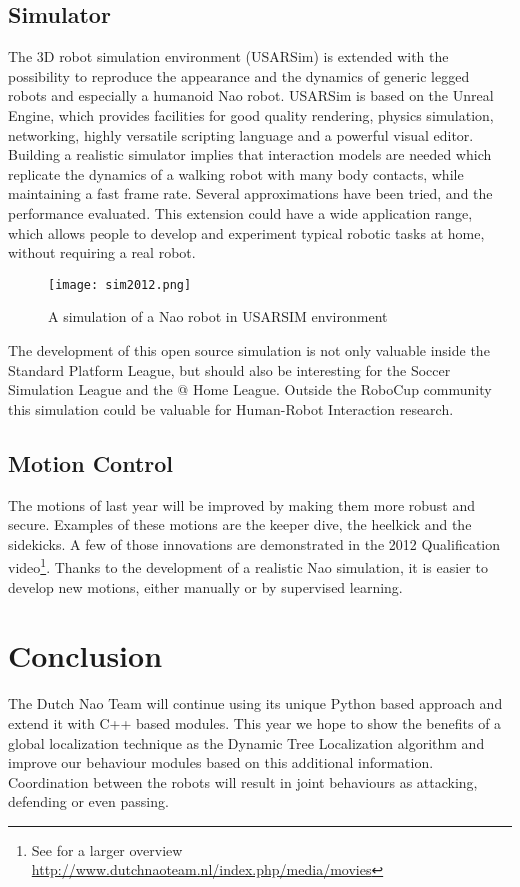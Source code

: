 \documentclass[11pt]{article}
\begin{document}
\subsection{Simulator}
The 3D robot simulation environment (USARSim) is extended with the possibility to reproduce the appearance and the dynamics of generic legged robots and especially a humanoid Nao robot. USARSim is based on the Unreal Engine, which provides facilities for good quality rendering, physics simulation, networking, highly versatile scripting language and a powerful visual editor. Building a realistic simulator implies that interaction models are needed which replicate the dynamics of a walking robot with many body contacts, while maintaining a fast frame rate. Several approximations have been tried, and the performance evaluated. This extension could have a wide application range, which allows people to develop and experiment typical robotic tasks at home, without requiring a real robot.
\begin{figure}[!ht]
\centering
\texttt{[image: sim2012.png]} %
\caption{A simulation of a Nao robot in USARSIM environment}
\end{figure}
The development of this open source simulation is not only valuable inside the Standard Platform League, but should also be interesting for the Soccer Simulation League and the @ Home League. Outside the RoboCup community this simulation could be valuable for Human-Robot Interaction research.
\subsection{Motion Control}
The motions of last year will be improved by making them more robust and secure. Examples of these motions are the keeper dive, the heelkick and the sidekicks. A few of those innovations are demonstrated in the 2012 Qualification video\footnote{See for a larger overview \url{http://www.dutchnaoteam.nl/index.php/media/movies}}. Thanks to the development of a realistic Nao simulation, it is easier to develop new motions, either manually or by supervised learning.
\section{Conclusion}
The Dutch Nao Team will continue using its unique Python based approach and extend it with C++ based modules. This year we hope to show the benefits of a global localization technique as the Dynamic Tree Localization algorithm and improve our behaviour modules based on this additional information.
Coordination between the robots will result in joint behaviours as attacking, defending or even passing.

 
\end{document}
